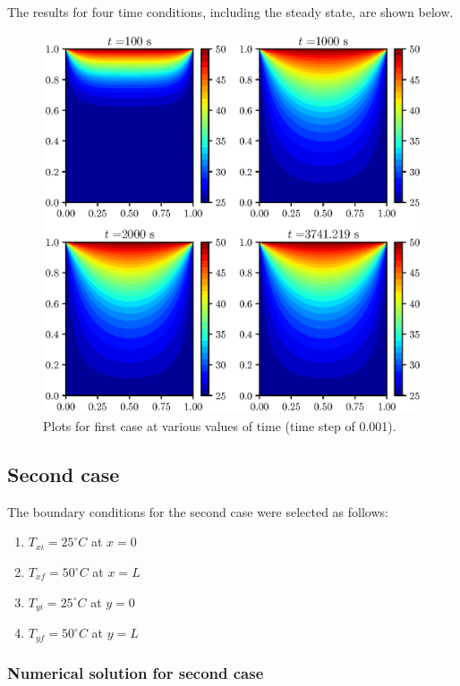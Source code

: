 \documentclass[12pt,a4paper,fleqn]{article}
\begin{document}
The results for four time conditions, including the steady state, are shown
below.

\begin{figure}[p!]
\centering
\includegraphics[width=\linewidth]{ht2dCase01.eps}
\caption{Plots for first case at various values of time (time step of 0.001).}
\end{figure}

\newpage

\subsection*{Second case}

The boundary conditions for the second case were selected as follows:

\begin{enumerate}
\item $T_{xi}=25^{\circ}C$ at $x=0$
\item $T_{xf}=50^{\circ}C$ at $x=L$
\item $T_{yi}=25^{\circ}C$ at $y=0$
\item $T_{yf}=50^{\circ}C$ at $y=L$
\end{enumerate}

\subsubsection*{Numerical solution for second case}
\end{document}
